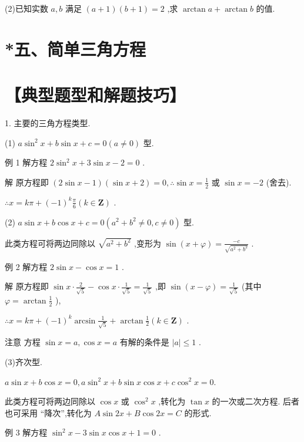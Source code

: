 \documentclass[10pt]{article}
\begin{document}
(2)已知实数 \(a,b\) 满足 \(\left( {a + 1}\right) \left( {b + 1}\right)  = 2\) ,求 \(\arctan a + \arctan b\) 的值.

\section*{*五、简单三角方程}

\section*{【典型题型和解题技巧】}

1. 主要的三角方程类型.

(1) \(a{\sin }^{2}x + b\sin x + c = 0\left( {a \neq  0}\right)\) 型.

例 1 解方程 \(2{\sin }^{2}x + 3\sin x - 2 = 0\) .

解 原方程即 \(\left( {2\sin x - 1}\right) \left( {\sin x + 2}\right)  = 0,\therefore \sin x = \frac{1}{2}\) 或 \(\sin x =  - 2\) (舍去).

\(\therefore x = {k\pi } + {\left( -1\right) }^{k}\frac{\pi }{6}\left( {k \in  \mathbf{Z}}\right)\) .

(2) \(a\sin x + b\cos x + c = 0\left( {{a}^{2} + {b}^{2} \neq  0,c \neq  0}\right)\) 型.

此类方程可将两边同除以 \(\sqrt{{a}^{2} + {b}^{2}}\) ,变形为 \(\sin \left( {x + \varphi }\right)  = \frac{-c}{\sqrt{{a}^{2} + {b}^{2}}}\) .

例 2 解方程 \(2\sin x - \cos x = 1\) .

解 原方程即 \(\sin x \cdot  \frac{2}{\sqrt{5}} - \cos x \cdot  \frac{1}{\sqrt{5}} = \frac{1}{\sqrt{5}}\) ,即 \(\sin \left( {x - \varphi }\right)  = \frac{1}{\sqrt{5}}\) (其中 \(\varphi  = \arctan \frac{1}{2}\) ),

\(\therefore x = {k\pi } + {\left( -1\right) }^{k}\arcsin \frac{1}{\sqrt{5}} + \arctan \frac{1}{2}\left( {k \in  \mathbf{Z}}\right)\) .

注意 方程 \(\sin x = a,\cos x = a\) 有解的条件是 \(\left| a\right|  \leq  1\) .

(3)齐次型.

\(a\sin x + b\cos x = 0,a{\sin }^{2}x + b\sin x\cos x + c{\cos }^{2}x = 0.\)

此类方程可将两边同除以 \(\cos x\) 或 \({\cos }^{2}x\) ,转化为 \(\tan x\) 的一次或二次方程. 后者也可采用 “降次”,转化为 \(A\sin {2x} + B\cos {2x} = C\) 的形式.

例 3 解方程 \({\sin }^{2}x - 3\sin x\cos x + 1 = 0\) .
\end{document}
